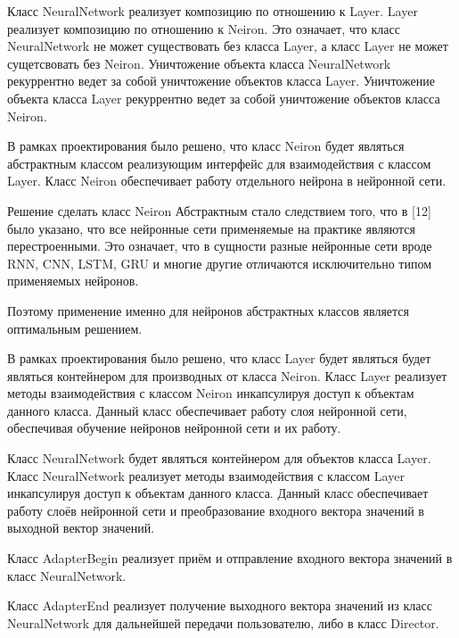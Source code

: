 {\par \redline  Класс NeuralNetwork реализует композицию по отношению к Layer. Layer реализует композицию по отношению к Neiron. Это означает, что класс NeuralNetwork не может существовать без класса Layer, а класс Layer не может сущетсвовать без Neiron. Уничтожение объекта класса NeuralNetwork рекуррентно ведет за собой уничтожение объектов класса Layer.  Уничтожение объекта класса Layer рекуррентно ведет за собой уничтожение объектов класса Neiron.

\par \redline  В рамках проектирования было решено, что класс Neiron будет являться абстрактным классом реализующим интерфейс для взаимодействия с классом Layer. Класс Neiron обеспечивает работу отдельного нейрона в нейронной сети.



\par \redline  Решение сделать класс Neiron Абстрактным стало следствием того, что в [12] было указано, что все нейронные сети применяемые на практике являются перестроенными. Это означает, что в сущности разные нейронные сети вроде RNN, CNN, LSTM, GRU и многие другие отличаются исключительно типом применяемых нейронов.

\par \redline Поэтому применение именно для нейронов абстрактных классов является оптимальным решением.  

\par \redline В рамках проектирования было решено, что класс Layer будет являться будет являться контейнером для производных от класса Neiron. Класс Layer реализует методы взаимодействия с классом Neiron инкапсулируя доступ к объектам данного класса. Данный класс обеспечивает работу слоя нейронной сети, обеспечивая обучение нейронов нейронной сети и их работу. 

\par \redline Класс NeuralNetwork будет являться контейнером для объектов класса Layer. Класс NeuralNetwork реализует методы взаимодействия с классом Layer инкапсулируя доступ к объектам данного класса. Данный класс обеспечивает работу слоёв нейронной сети и преобразование входного вектора значений в выходной вектор значений. 

\par \redline Класс AdapterBegin реализует приём и отправление входного вектора значений в класс NeuralNetwork.  

\par \redline  Класс AdapterEnd реализует получение выходного вектора значений из класс Neural\newline Network для дальнейшей передачи пользователю, либо в класс Director.

}
